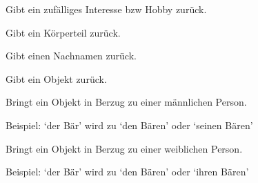 \documentclass[a4paper,12pt,oneside]{sphinxmanual}
\begin{document}
\begin{fulllineitems}
\label{module:pyzufall.generator.interesse}
Gibt ein zufälliges Interesse bzw Hobby zurück.

\end{fulllineitems}


\begin{fulllineitems}
\label{module:pyzufall.generator.koerperteil}
Gibt ein Körperteil zurück.

\end{fulllineitems}


\begin{fulllineitems}
\label{module:pyzufall.generator.nachname}
Gibt einen Nachnamen zurück.

\end{fulllineitems}


\begin{fulllineitems}
\label{module:pyzufall.generator.objekt}
Gibt ein Objekt zurück.

\end{fulllineitems}


\begin{fulllineitems}
\label{module:pyzufall.generator.objekt_m}
Bringt ein Objekt in Berzug zu einer männlichen Person.

Beispiel:
`der Bär' wird zu `den Bären' oder `seinen Bären'

\end{fulllineitems}


\begin{fulllineitems}
\label{module:pyzufall.generator.objekt_w}
Bringt ein Objekt in Berzug zu einer weiblichen Person.

Beispiel:
`der Bär' wird zu `den Bären' oder `ihren Bären'

\end{fulllineitems}
\end{document}
